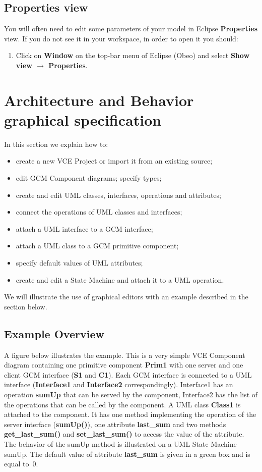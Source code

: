 \documentclass[12pt]{article}
\begin{document}
\subsection{Properties view}

You will often need to edit some parameters of your model in Eclipse \textbf{Properties} view. If you do not see it in your workspace, in order to open it you should:

\begin{enumerate}
\item
Click on \textbf{Window} on the top-bar menu of Eclipse (Obeo) and select \textbf{Show view $\rightarrow$ Properties}.
\end{enumerate}

\section{Architecture and Behavior graphical specification}\label{sec:graph}
In this section we explain how to:
\begin{itemize}
\item
create a new VCE Project or import it from an existing source;
\item
edit GCM Component diagrams;
specify types;
\item
create and edit UML classes, interfaces, operations and attributes;
\item
connect the operations of UML classes and interfaces;
\item
attach a UML interface to a GCM interface;
\item
attach a UML class to a GCM primitive component;
\item
specify default values of UML attributes;
\item
create and edit a State Machine and attach it to a UML operation.
\end{itemize}

We will illustrate the use of graphical editors with an example described in the section below.

\subsection{Example Overview}

A figure below illustrates the example. This is a very simple VCE Component diagram containing one primitive component \textbf{Prim1} with one server and one client GCM interface (\textbf{S1} and \textbf{C1}). Each GCM interface is connected to a UML interface (\textbf{Interface1} and \textbf{Interface2} correspondingly). Interface1 has an operation \textbf{sumUp} that can be served by the component, Interface2 has the list of the operations that can be called by the component. A UML class \textbf{Class1} is attached to the component. It has one method implementing the operation of the server interface (\textbf{sumUp()}), one attribute \textbf{last\_sum} and two methods \textbf{get\_last\_sum()} and \textbf{set\_last\_sum()} to access the value of the attribute. The behavior of the sumUp  method is illustrated on a UML State Machine sumUp. The default value of attribute \textbf{last\_sum} is given in a green box and is equal to~0.
\end{document}
